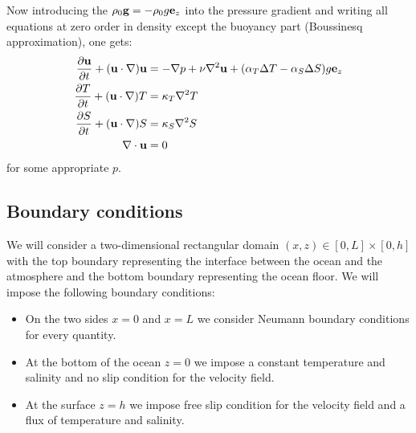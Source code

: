 \documentclass{article}
\begin{document}
Now introducing the $\rho_0\mathbf{g}=-\rho_0g\boldsymbol{\mathrm{e}}_z$ into the pressure gradient and writing all equations at zero order in density except the buoyancy part (Boussinesq approximation), one gets:
\begin{equation}\label{eq:boussinesq}
  \begin{aligned}
    \frac{\partial\mathbf{u}}{\partial t} + (\mathbf{u}\cdot\nabla)\mathbf{u} & = -\nabla p+ \nu\nabla^2\mathbf{u} + (\alpha_T\Delta T - \alpha_S\Delta S)g\boldsymbol{\mathrm{e}}_z \\
    \frac{\partial T}{\partial t} + (\mathbf{u}\cdot\nabla)T                  & = \kappa_T \nabla^2T                                                                \\
    \frac{\partial S}{\partial t} + (\mathbf{u}\cdot\nabla)S                  & = \kappa_S \nabla^2S                                                                \\
    \nabla\cdot\mathbf{u}                                                     & = 0
  \end{aligned}
\end{equation}
for some appropriate $p$.

\subsection{Boundary conditions}\label{sec:boundary_conditions}
We will consider a two-dimensional rectangular domain $(x,z) \in [0,L]\times[0,h]$ with the top boundary representing the interface between the ocean and the atmosphere and the bottom boundary representing the ocean floor. We will impose the following boundary conditions:
\begin{itemize}
  \item On the two sides $x = 0$ and $x = L$ we consider Neumann boundary conditions for every quantity.
  \item At the bottom of the ocean $z = 0$ we impose a constant temperature and salinity and no slip condition for the velocity field.
  \item At the surface $z = h$ we impose free slip condition for the velocity field and a flux of temperature and salinity.
\end{itemize}
\end{document}
